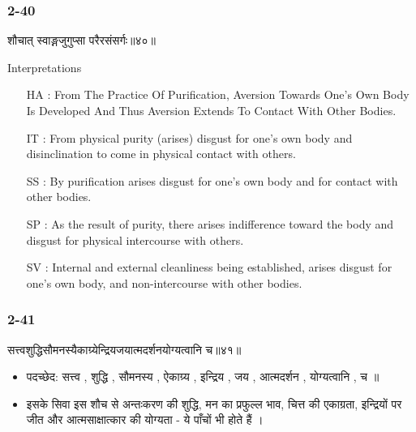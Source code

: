 \begin{frame}[fragile]\frametitle{2-40}
\begin{sanskrit}
शौचात् स्वाङ्गजुगुप्सा परैरसंसर्गः॥४०॥
\end{sanskrit}

Interpretations
\begin{itemize}
\item [HA]: From The Practice Of Purification, Aversion Towards One’s Own Body Is Developed And Thus Aversion Extends To Contact With Other Bodies.
\item [IT]: From physical purity (arises) disgust for one’s own body and disinclination to come in physical contact with others.
\item [SS]: By purification arises disgust for one’s own body and for contact with other bodies.
\item [SP]: As the result of purity, there arises indifference toward the body and disgust for physical intercourse with others.
\item [SV]: Internal and external cleanliness being established, arises disgust for one’s own body, and non-intercourse with other bodies. 
\end{itemize}
\end{frame}


\begin{frame}[fragile]\frametitle{2-41}
\begin{sanskrit}
सत्त्वशुद्धिसौमनस्यैकाग्र्येन्द्रियजयात्मदर्शनयोग्यत्वानि च॥४१॥
\end{sanskrit}

\begin{itemize}
\item पदच्छेद: सत्त्व , शुद्धि , सौमनस्य , ऐकाग्र्य , इन्द्रिय , जय , आत्मदर्शन , योग्यत्वानि , च ॥
\item इसके सिवा इस शौच से अन्तःकरण की शुद्धि, मन का प्रफुल्ल भाव, चित्त की एकाग्रता, इन्द्रियों पर जीत और आत्मसाक्षात्कार की योग्यता - ये पाँचों भी होते हैं ।
\end{itemize}	
	
\end{frame}

